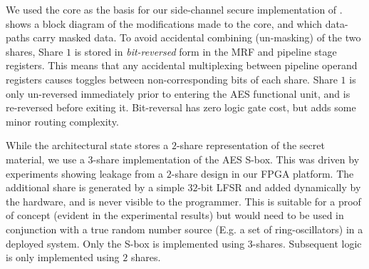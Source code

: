 We used the  core as the basis for our side-channel secure
implementation of .
 shows a block diagram of the modifications
made to the core, and which data-paths carry masked data.
To avoid accidental combining (un-masking) of the two shares,
Share $1$ is stored in {\em bit-reversed} form in the MRF and pipeline
stage registers.
This means that any accidental multiplexing between pipeline operand
registers causes toggles between non-corresponding bits of each share.
Share $1$ is only un-reversed immediately prior to entering the
AES functional unit, and is re-reversed before exiting it.
Bit-reversal has zero logic gate cost, but adds some minor routing
complexity.

While the architectural state stores a $2$-share representation
of the secret material, we use a $3$-share implementation of the
AES S-box.
This was driven by experiments showing 
leakage from a $2$-share design in our FPGA platform.
The additional share is generated by a simple $32$-bit LFSR and added
dynamically by the hardware, and is never visible to the programmer.
This is suitable for a proof of concept (evident in the experimental
results) but would need to be used in conjunction with a true random
number source (E.g. a set of ring-oscillators) in a deployed system.
Only the S-box is implemented using $3$-shares.
Subsequent  logic is only implemented using $2$ shares.

